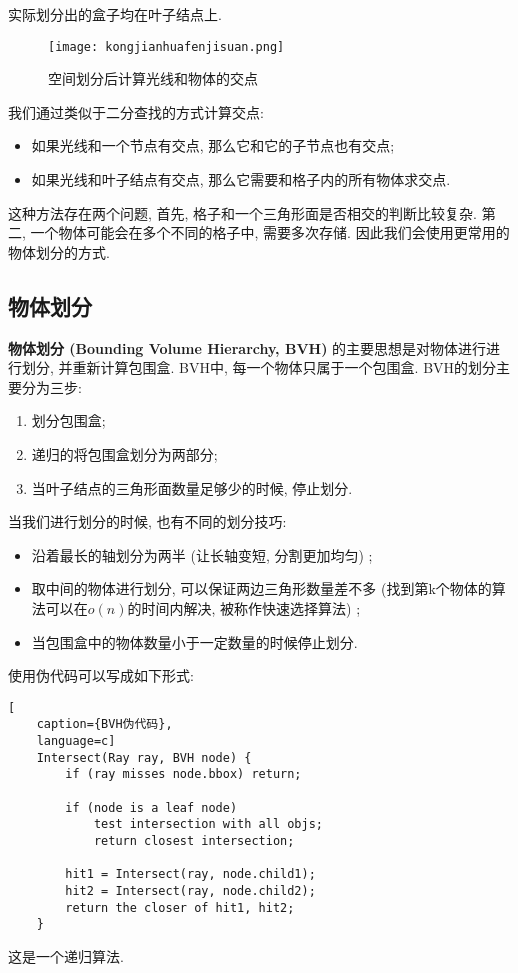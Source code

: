 实际划分出的盒子均在叶子结点上. 

\begin{figure}[H]
	\centering
	\texttt{[image: kongjianhuafenjisuan.png]}
	\caption{空间划分后计算光线和物体的交点}
	\label{fig:kjhfjs}
\end{figure}
我们通过类似于二分查找的方式计算交点: 
\begin{itemize}
	\item 如果光线和一个节点有交点, 那么它和它的子节点也有交点; 
	\item 如果光线和叶子结点有交点, 那么它需要和格子内的所有物体求交点. 
\end{itemize}
这种方法存在两个问题, 首先, 格子和一个三角形面是否相交的判断比较复杂. 第二, 一个物体可能会在多个不同的格子中, 需要多次存储. 因此我们会使用更常用的物体划分的方式. 

\subsection{物体划分}
\textbf{物体划分 (Bounding Volume Hierarchy, BVH) }的主要思想是对物体进行进行划分, 并重新计算包围盒. BVH中, 每一个物体只属于一个包围盒. BVH的划分主要分为三步: 
\begin{enumerate}
	\item 划分包围盒; 
	\item 递归的将包围盒划分为两部分; 
	\item 当叶子结点的三角形面数量足够少的时候, 停止划分. 
\end{enumerate}
当我们进行划分的时候, 也有不同的划分技巧: 
\begin{itemize}
	\item 沿着最长的轴划分为两半 (让长轴变短, 分割更加均匀) ; 
	\item 取中间的物体进行划分, 可以保证两边三角形数量差不多 (找到第k个物体的算法可以在$o(n)$的时间内解决, 被称作快速选择算法) ; 
	\item 当包围盒中的物体数量小于一定数量的时候停止划分. 
\end{itemize}
使用伪代码可以写成如下形式: 
\begin{lstlisting}[
	caption={BVH伪代码},
	language=c]
	Intersect(Ray ray, BVH node) {
		if (ray misses node.bbox) return;
		
		if (node is a leaf node)
			test intersection with all objs;
			return closest intersection;
		
		hit1 = Intersect(ray, node.child1);
		hit2 = Intersect(ray, node.child2);
		return the closer of hit1, hit2;
	}
\end{lstlisting}
这是一个递归算法. 


